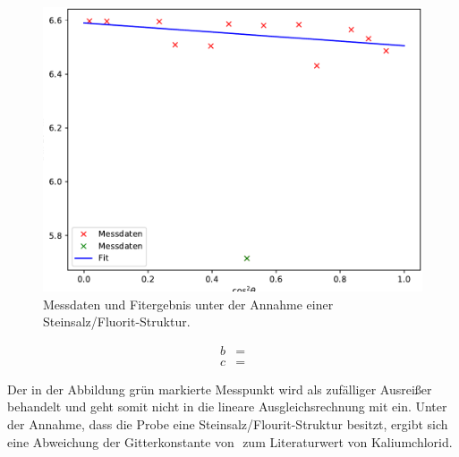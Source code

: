 \begin{figure}
  \centering
  \includegraphics[scale=0.75]{build/Salz_3.pdf}
  \caption{Messdaten und Fitergebnis unter der Annahme einer Steinsalz/Fluorit-Struktur.}
  \label{fig:SalzC2}
\end{figure}

\begin{align}
	b&=  \\
	c&= 
\end{align}

Der in der Abbildung grün markierte Messpunkt wird als zufälliger Ausreißer behandelt und geht somit nicht in die lineare Ausgleichsrechnung mit ein.
Unter der Annahme, dass die Probe eine Steinsalz/Flourit-Struktur besitzt, ergibt sich eine Abweichung der Gitterkonstante von $$ zum Literaturwert \cite{Kaliumchlorid} von Kaliumchlorid.






